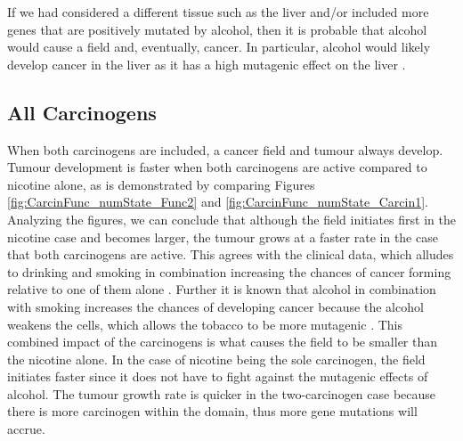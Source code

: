 \documentclass[\main/thesis.tex]{subfiles}
\begin{document}
If we had considered a different tissue such as the liver and/or included more genes that are positively mutated by alcohol, then it is probable that alcohol would cause a field and, eventually, cancer. In particular, alcohol would likely develop cancer in the liver as it has a high mutagenic effect on the liver \cite{Bagnardi,Grewal,Petrick}.

\subsection{All Carcinogens}
When both carcinogens are included, a cancer field and tumour always develop. Tumour development is faster when both carcinogens are active compared to nicotine alone, as is demonstrated by comparing Figures \ref{fig:CarcinFunc_numState_Func2} and \ref{fig:CarcinFunc_numState_Carcin1}. Analyzing the figures, we can conclude that although the field initiates first in the nicotine case and becomes larger, the tumour grows at a faster rate in the case that both carcinogens are active. This agrees with the clinical data, which alludes to drinking and smoking in combination increasing the chances of cancer forming relative to one of them alone \cite{cancer.net_2021}. Further it is known that alcohol in combination with smoking increases the chances of developing cancer because the alcohol weakens the cells, which allows the tobacco to be more mutagenic \cite{Weinberg}. This combined impact of the carcinogens is what causes the field to be smaller than the nicotine alone. In the case of nicotine being the sole carcinogen, the field initiates faster since it does not have to fight against the mutagenic effects of alcohol. The tumour growth rate is quicker in the two-carcinogen case because there is more carcinogen within the domain, thus more gene mutations will accrue.
\end{document}
